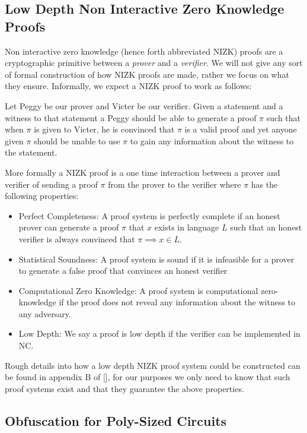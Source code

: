 \documentclass[12pt,twoside]{reedthesis}
\begin{document}
       \subsection{Low Depth Non Interactive Zero Knowledge Proofs}
       
       Non interactive zero knowledge (hence forth abbreviated NIZK) proofs are a cryptographic primitive between a \textit{prover} and a \textit{verifier}. We will not give any sort of formal construction of how NIZK proofs are made, rather we focus on what they ensure. Informally, we expect a NIZK proof to work as follows:
       \par Let Peggy be our prover and Victer be our verifier. Given a statement and a witness to that statement a Peggy should be able to generate a proof $\pi$ such that when $\pi$ is given to Victer, he is convinced that $\pi$ is a valid proof and yet anyone given $\pi$ should be unable to use $\pi$ to gain any information about the witness to the statement.
       \par More formally a NIZK proof is a one time interaction between a prover and verifier of sending a proof $\pi$ from the prover to the verifier where $\pi$ has the following properties:
       \begin{itemize}
       \item Perfect Completeness: A proof system is perfectly complete if an honest prover can generate a proof $\pi$ that $x$ exists in language $L$ such that an honest verifier is always convinced that $\pi \implies x\in L$.
       \item Statistical Soundness: A proof system is sound if it is infeasible for a prover to generate a false proof that convinces an honest verifier
       \item Computational Zero Knowledge: A proof system is computational zero-knowledge if the proof does not reveal any information about the witness to any adversary.
       \item Low Depth: We say a proof is low depth if the verifier can be implemented in NC.
         \end{itemize}
    
    
    \par Rough details into how a low depth NIZK proof system could be constructed can be found in appendix B of [\cite{Garg:2013}], for our purposes we only need to know that such proof systems exist and that they guarantee the above properties.
    
    \subsection{Obfuscation for Poly-Sized Circuits}
    
\end{document}
